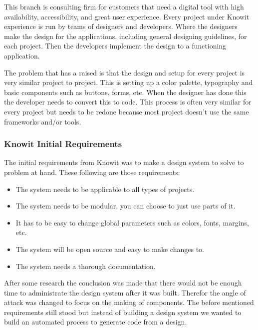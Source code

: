 This branch is consulting firm for customers that need a digital tool with high availability, accessibility, and great user experience. Every project under Knowit experience is run by teams of designers and developers. Where the designers make the design for the applications, including general designing guidelines, for each project. Then the developers implement the design to a functioning application.  

The problem that has a raised is that the design and setup for every project is very similar project to project. This is setting up a color palette, typography and basic components such as buttons, forms, etc. When the designer has done this the developer needs to convert this to code. This process is often very similar for every project but needs to be redone because most project doesn't use the same frameworks and/or tools. 

\subsubsection{Knowit Initial Requirements}%
\label{ssub:Knowit Initial Requirements}
The initial requirements from Knowit was to make a design system\cite{fanguyComprehensiveGuideDesign} to solve to problem at hand. These following are those requirements: 
\begin{itemize}
  \item The system needs to be applicable to all types of projects.
  \item The system needs to be modular, you can choose to just use parts of it.
  \item It has to be easy to change global parameters such as colors, fonts, margins, etc.
  \item The system will be open source and easy to make changes to.
  \item The system needs a thorough documentation.
\end{itemize}

After some research the conclusion was made that there would not be enough time to administrate the design system after it was built. Therefor the angle of attack was changed to focus on the making of components. The before mentioned requirements still stood but instead of building a design system we wanted to build an automated process to generate code from a design. 








